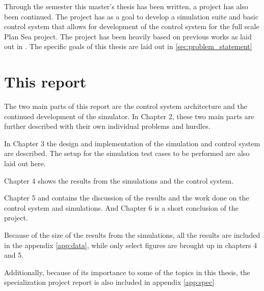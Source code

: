 \documentclass[class=article, crop=false]{standalone}
\begin{document}
Through the semester this master's thesis has been written, a project has also been continued. The project has as a goal to develop a simulation suite and basic control system that allows for development of the control system for the full scale Plan Sea project. The project has been heavily based on previous works as laid out in \cite{specialization}. The specific goals of this thesis are laid out in \cref{sec:problem_statement}


\section{This report}
The two main parts of this report are the control system architecture and the continued development of the simulator. In Chapter 2, these two main parts are further described with their own individual problems and hurdles.

In Chapter 3 the design and implementation of the simulation and control system are described. The setup for the simulation test cases to be performed are also laid out here.

Chapter 4 shows the results from the simulations and the control system.

Chapter 5 and contains the discussion of the results and the work done on the control system and simulations. And Chapter 6 is a short conclusion of the project.

Because of the size of the results from the simulations, all the results are included in the appendix \ref{app:data}, while only select figures are brought up in chapters 4 and 5.

Additionally, because of its importance to some of the topics in this thesis, the specialization project report is also included in appendix \ref{app:spec}
\end{document}
